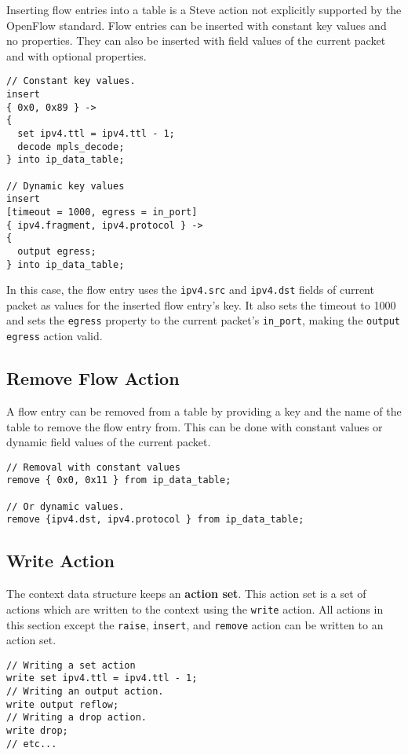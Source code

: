 Inserting flow entries into a table is a Steve action not explicitly supported by the OpenFlow standard. Flow entries can be inserted with constant key values and no properties. They can also be inserted with field values of the current packet and with optional properties.

\begin{lstlisting}[float]
// Constant key values.
insert
{ 0x0, 0x89 } ->
{
  set ipv4.ttl = ipv4.ttl - 1;
  decode mpls_decode;
} into ip_data_table;

// Dynamic key values
insert
[timeout = 1000, egress = in_port]
{ ipv4.fragment, ipv4.protocol } ->
{
  output egress;
} into ip_data_table;
\end{lstlisting}

In this case, the flow entry uses the \texttt{ipv4.src} and \texttt{ipv4.dst} fields of current packet as values for the inserted flow entry's key. It also sets the timeout to 1000 and sets the \texttt{egress} property to the current packet's \texttt{in\_port}, making the \texttt{output egress} action valid.

\subsection{Remove Flow Action} \label{remove_flow_action_tut}

A flow entry can be removed from a table by providing a key and the name of the table to remove the flow entry from. This can be done with constant values or dynamic field values of the current packet.

\begin{lstlisting}
// Removal with constant values
remove { 0x0, 0x11 } from ip_data_table;

// Or dynamic values.
remove {ipv4.dst, ipv4.protocol } from ip_data_table;
\end{lstlisting}

\subsection{Write Action} \label{write_action_tut}

The context data structure keeps an \textbf{action set}. This action set is a set of actions which are written to the context using the \texttt{write} action. All actions in this section except the \texttt{raise}, \texttt{insert}, and \texttt{remove} action can be written to an action set.

\begin{lstlisting}
// Writing a set action
write set ipv4.ttl = ipv4.ttl - 1;
// Writing an output action.
write output reflow;
// Writing a drop action.
write drop;
// etc...
\end{lstlisting}

